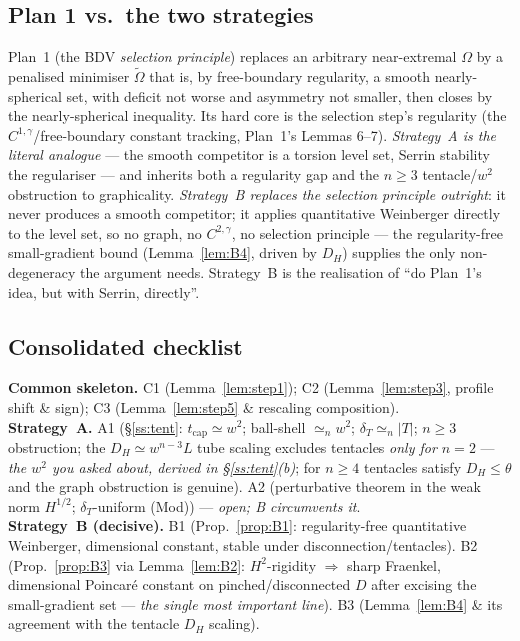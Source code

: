 \documentclass[11pt]{amsart}
\theoremstyle{definition}
\theoremstyle{remark}
\newcommand{\Om}{\Omega}
\newcommand{\Ot}{\widetilde\Omega}
\newcommand{\dT}{\delta_T}
\begin{document}
\subsection{Plan 1 vs.\ the two strategies}
Plan~1 (the BDV \emph{selection principle}) replaces an arbitrary
near-extremal $\Om$ by a penalised minimiser $\Ot$ that is, by free-boundary
regularity, a smooth nearly-spherical set, with deficit not worse and
asymmetry not smaller, then closes by the nearly-spherical inequality. Its hard
core is the selection step's regularity (the $C^{1,\gamma}$/free-boundary
constant tracking, Plan~1's Lemmas 6--7). \emph{Strategy~A is the literal
analogue} --- the smooth competitor is a torsion level set, Serrin stability
the regulariser --- and inherits both a regularity gap and the $n\ge3$
tentacle/$w^2$ obstruction to graphicality. \emph{Strategy~B replaces the
selection principle outright}: it never produces a smooth competitor; it
applies quantitative Weinberger directly to the level set, so no graph, no
$C^{2,\gamma}$, no selection principle --- the regularity-free
small-gradient bound (Lemma~\ref{lem:B4}, driven by $D_H$) supplies the only
non-degeneracy the argument needs.
Strategy~B is the realisation of ``do Plan~1's idea, but with Serrin,
directly''.

\subsection{Consolidated checklist}
\textbf{Common skeleton.} C1 (Lemma~\ref{lem:step1}); C2
(Lemma~\ref{lem:step3}, profile shift \& sign); C3 (Lemma~\ref{lem:step5} \&
rescaling composition).\\
\textbf{Strategy~A.} A1 (\S\ref{ss:tent}: $t_{\mathrm{cap}}\simeq w^2$;
ball-shell $\simeq_n w^2$; $\dT\simeq_n|T|$; $n\ge3$ obstruction; the
$D_H\simeq w^{n-3}L$ tube scaling excludes tentacles \emph{only for
$n=2$} --- \emph{the $w^2$ you asked about, derived in
\S\ref{ss:tent}(b)}; for $n\ge4$ tentacles satisfy $D_H\le\theta$ and the
graph obstruction is genuine). A2 (perturbative theorem in the weak
norm $H^{1/2}$; $\dT$-uniform (Mod)) --- \emph{open; B circumvents it}.\\
\textbf{Strategy~B (decisive).} B1 (Prop.~\ref{prop:B1}: regularity-free
quantitative Weinberger, dimensional constant, stable under
disconnection/tentacles). B2 (Prop.~\ref{prop:B3} via Lemma~\ref{lem:B2}:
$H^2$-rigidity $\Rightarrow$ sharp Fraenkel, dimensional Poincar\'e constant
on pinched/disconnected $D$ after excising the small-gradient set ---
\emph{the single most important line}). B3 (Lemma~\ref{lem:B4} \& its
agreement with the tentacle $D_H$ scaling).
\end{document}
